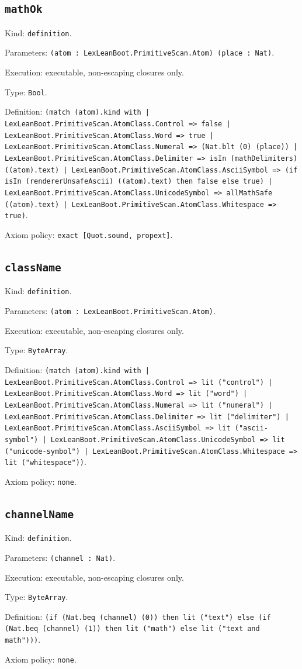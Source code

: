\documentclass[11pt]{article}
\begin{document}
\subsection*{\texttt{mathOk}}
\noindent Kind: \texttt{definition}.\par
\noindent Parameters: \texttt{(atom : LexLeanBoot.PrimitiveScan.Atom) (place : Nat)}.\par
\noindent Execution: executable, non-escaping closures only.\par
\noindent Type: \texttt{Bool}.\par
\noindent Definition: \texttt{(match (atom).kind with | LexLeanBoot.PrimitiveScan.AtomClass.Control => false | LexLeanBoot.PrimitiveScan.AtomClass.Word => true | LexLeanBoot.PrimitiveScan.AtomClass.Numeral => (Nat.blt (0) (place)) | LexLeanBoot.PrimitiveScan.AtomClass.Delimiter => isIn (mathDelimiters) ((atom).text) | LexLeanBoot.PrimitiveScan.AtomClass.AsciiSymbol => (if isIn (rendererUnsafeAscii) ((atom).text) then false else true) | LexLeanBoot.PrimitiveScan.AtomClass.UnicodeSymbol => allMathSafe ((atom).text) | LexLeanBoot.PrimitiveScan.AtomClass.Whitespace => true)}.\par
\noindent Axiom policy: \texttt{exact [Quot.sound, propext]}.\par
\subsection*{\texttt{className}}
\noindent Kind: \texttt{definition}.\par
\noindent Parameters: \texttt{(atom : LexLeanBoot.PrimitiveScan.Atom)}.\par
\noindent Execution: executable, non-escaping closures only.\par
\noindent Type: \texttt{ByteArray}.\par
\noindent Definition: \texttt{(match (atom).kind with | LexLeanBoot.PrimitiveScan.AtomClass.Control => lit ("control") | LexLeanBoot.PrimitiveScan.AtomClass.Word => lit ("word") | LexLeanBoot.PrimitiveScan.AtomClass.Numeral => lit ("numeral") | LexLeanBoot.PrimitiveScan.AtomClass.Delimiter => lit ("delimiter") | LexLeanBoot.PrimitiveScan.AtomClass.AsciiSymbol => lit ("ascii-symbol") | LexLeanBoot.PrimitiveScan.AtomClass.UnicodeSymbol => lit ("unicode-symbol") | LexLeanBoot.PrimitiveScan.AtomClass.Whitespace => lit ("whitespace"))}.\par
\noindent Axiom policy: \texttt{none}.\par
\subsection*{\texttt{channelName}}
\noindent Kind: \texttt{definition}.\par
\noindent Parameters: \texttt{(channel : Nat)}.\par
\noindent Execution: executable, non-escaping closures only.\par
\noindent Type: \texttt{ByteArray}.\par
\noindent Definition: \texttt{(if (Nat.beq (channel) (0)) then lit ("text") else (if (Nat.beq (channel) (1)) then lit ("math") else lit ("text and math")))}.\par
\noindent Axiom policy: \texttt{none}.\par
\end{document}
